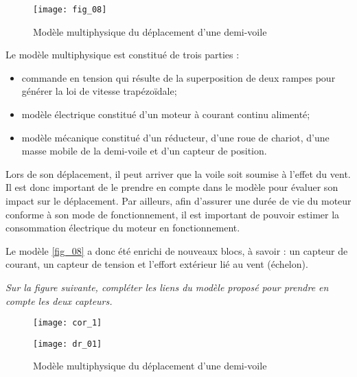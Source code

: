 \begin{figure}[H]
\centering
\texttt{[image: fig\_08]}
\caption{Modèle multiphysique du déplacement d’une demi-voile \label{fig_08}}
\end{figure}

Le modèle multiphysique est constitué de trois parties :
\begin{itemize}
\item commande en tension qui résulte de la superposition de deux rampes pour générer la loi de vitesse trapézoïdale;
\item modèle électrique constitué d’un moteur à courant continu alimenté;%
\item modèle mécanique constitué d’un réducteur, d’une roue de chariot, d’une masse mobile de la demi-voile et
d’un capteur de position.
\end{itemize}


%

Lors de son déplacement, il peut arriver que la voile soit soumise à l’effet du vent. Il est donc important de
le prendre en compte dans le modèle pour évaluer son impact sur le déplacement. Par ailleurs, afin d’assurer
une durée de vie du moteur conforme à son mode de fonctionnement, il est important de pouvoir estimer la
consommation électrique du moteur en fonctionnement.

Le modèle \autoref{fig_08} a donc été enrichi de nouveaux blocs, à savoir : un capteur de courant, un capteur de tension
et l’effort extérieur lié au vent (échelon).
\fi


\question{\label{q5}}\textit{Sur la figure suivante, compléter les liens du modèle proposé pour prendre en compte
les deux capteurs.}
\ifprof
\begin{corrige}
\begin{figure}[H]
\centering
\texttt{[image: cor\_1]}
\end{figure}
\end{corrige}
\else
\fi





\ifprof
\else
\begin{figure}[H]
\centering
\texttt{[image: dr\_01]}
\caption{Modèle multiphysique du déplacement d’une demi-voile \label{dr_01}}
\end{figure}

\fi
